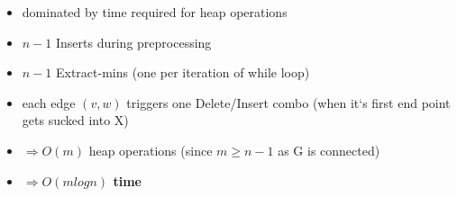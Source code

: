 \documentclass[a4paper,12pt]{article}
\theoremstyle{plain}
\theoremstyle{definition}
\theoremstyle{remark}
\begin{document}
\begin{itemize}
	\item dominated by time required for heap operations
	\item $n-1$ Inserts during preprocessing
	\item $n-1$ Extract-mins (one per iteration of while loop)
	\item each edge $(v,w)$ triggers one Delete/Insert combo (when it`s first end point gets sucked into X)
	\item $\Rightarrow O(m)$ heap operations (since $m \geq n-1$ as G is connected)
	\item \textbf{$\Rightarrow O(m log n)$ time}
\end{itemize}
\end{document}
